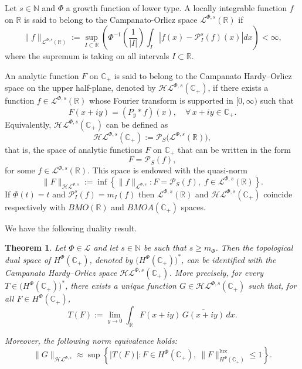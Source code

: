 \documentclass[a4paper,12pt,intlimits,oneside]{amsart}
\newtheorem{theorem}{Theorem}[section]
\theoremstyle{definition}
\numberwithin{equation}{section}
\theoremstyle{definition}
\begin{document}
Let  $s \in \mathbb{N}$ and  $\Phi$ a growth function of lower type. A locally integrable function $f$ on $\mathbb{R}$ is said to belong to the Campanato-Orlicz space   $\mathcal{L}^{\Phi,s}(\mathbb{R})$  if
$$  \|f\|_{\mathcal{L}^{\Phi,s}(\mathbb{R})}:= \sup_{I \subset \mathbb{R}} \left(\Phi^{-1}\left(\frac{1}{|I|}\right)\int_{I}|f(x)-\mathcal{P}_{I}^{s}(f)(x)|dx \right) < \infty,   $$
  where  the supremum is taking on all intervals $I \subset \mathbb{R}$.  

An analytic function $F$ on $\mathbb{C}_{+}$ is said to belong to the Campanato Hardy--Orlicz space on the upper half-plane, denoted by $\mathcal{H}\mathcal{L}^{\Phi,s}(\mathbb{C}_{+})$, if there exists a function $f \in \mathcal{L}^{\Phi,s}(\mathbb{R})$ whose Fourier transform is supported in $[0,\infty)$ such that
\[
F(x+iy) = (P_y * f)(x), \quad \forall\, x+iy \in \mathbb{C}_{+}.
\]
Equivalently, $\mathcal{H}\mathcal{L}^{\Phi,s}(\mathbb{C}_{+})$ can be defined as
\[
\mathcal{H}\mathcal{L}^{\Phi,s}(\mathbb{C}_{+}) := \mathcal{P}_S\big(\mathcal{L}^{\Phi,s}(\mathbb{R})\big),
\]
that is, the space of analytic functions $F$ on $\mathbb{C}_{+}$ that can be written in the form
\[
F = \mathcal{P}_S(f),
\]
for some $f \in \mathcal{L}^{\Phi,s}(\mathbb{R})$. This space is endowed with the quasi-norm
\[
\|F\|_{\mathcal{H}\mathcal{L}^{\Phi,s}} := \inf \left\{ \|f\|_{\mathcal{L}^{\Phi,s}} : F = \mathcal{P}_S(f),\; f \in \mathcal{L}^{\Phi,s}(\mathbb{R}) \right\}.
\]
If  $\Phi(t) = t$ and $\mathcal{P}_{I}^{s}(f)
   =m_{I}(f)$ then   $\mathcal{L}^{\Phi,s}(\mathbb{R})$ and   $\mathcal{H}\mathcal{L}^{\Phi,s}(\mathbb{C}_{+})$ coincide respectively with  $BMO(\mathbb{R})$ and  $BMOA(\mathbb{C}_{+})$ spaces. 

We have the following duality result.
\begin{theorem}\label{pro:main2aaop}
Let $\Phi \in \mathscr{L}$ and let $s \in \mathbb{N}$ be such that $s \geq m_{\Phi}$. Then the topological dual space of $H^{\Phi}(\mathbb{C}_{+})$, denoted by $\big(H^{\Phi}(\mathbb{C}_{+})\big)^{*}$, can be identified with the Campanato Hardy--Orlicz space $\mathcal{H}\mathcal{L}^{\Phi,s}(\mathbb{C}_{+})$. More precisely, for every $T \in \big(H^{\Phi}(\mathbb{C}_{+})\big)^{*}$, there exists a unique function $G \in \mathcal{H}\mathcal{L}^{\Phi,s}(\mathbb{C}_{+})$ such that, for all $F \in H^{\Phi}(\mathbb{C}_{+})$,
\[
T(F) := \lim_{y \to 0} \int_{\mathbb{R}} F(x+iy)\,\overline{G(x+iy)}\, dx.
\]

Moreover, the following norm equivalence holds:
\[
\|G\|_{\mathcal{H}\mathcal{L}^{\Phi,s}} \approx \sup \left\{ |T(F)| : F \in H^{\Phi}(\mathbb{C}_{+}),\ \|F\|_{H^{\Phi}(\mathbb{C}_{+})}^{\mathrm{lux}} \leq 1 \right\}.
\]
\end{theorem}
\end{document}
